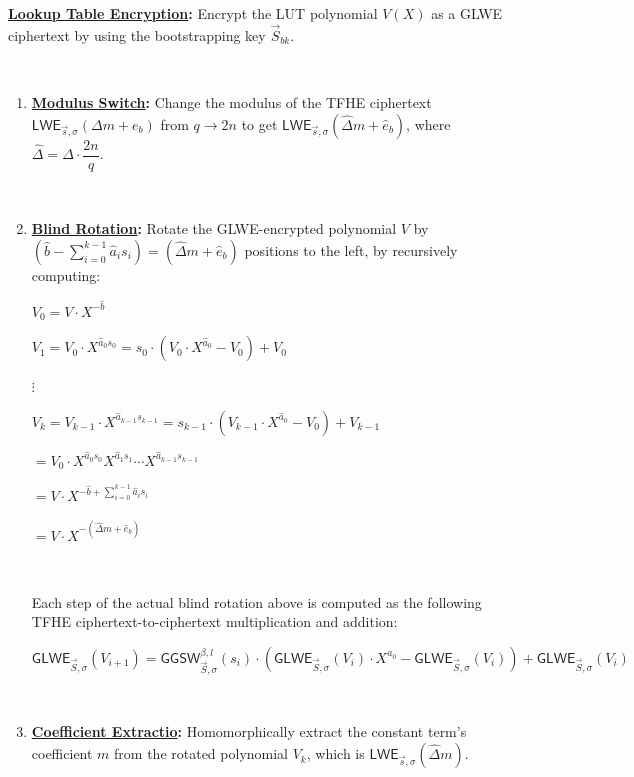 \begin{tcolorbox}[title={\textbf{\tboxlabel{\ref*{subsec:tfhe-summary}} TFHE Noise Bootstrapping Procedure}}]

\textbf{\underline{Lookup Table Encryption}:} Encrypt the LUT polynomial $V(X)$ as a GLWE ciphertext by using the bootstrapping key $\vec{S}_{bk}$.

$ $
  
\begin{enumerate}
\item \textbf{\underline{Modulus Switch}:} Change the modulus of the TFHE ciphertext $\textsf{LWE}_{\vec{s}, \sigma}(\Delta m + e_b)$ from $q \rightarrow 2n$ to get $\textsf{LWE}_{\vec{s}, \sigma}(\hat{\Delta} m + \hat e_b)$, where $\hat\Delta = \Delta \cdot \dfrac{2n}{q}$.

$ $

\item \textbf{\underline{Blind Rotation}:} Rotate the GLWE-encrypted polynomial $V$ by $(\hat{b} - \sum\limits_{i=0}^{k-1}{\hat{a}_is_i}) = (\hat{\Delta}m + \hat{e}_b)$ positions to the left, by recursively computing: 

$V_0 = V \cdot X^{-\hat{b}}$

$V_1 = V_0 \cdot X^{\hat{a}_0s_0} = s_0 \cdot (V_0 \cdot X^{\hat{a}_0} - V_0) + V_0$

\text{ } $\vdots$

$V_k = V_{k-1} \cdot X^{\hat{a}_{k-1}s_{k-1}} = s_{k-1} \cdot (V_{k-1} \cdot X^{\hat{a}_0} - V_0) + V_{k-1}$

$= V_0 \cdot X^{\hat{a}_0s_0}X^{\hat{a}_1s_1}\cdots X^{\hat{a}_{k-1}s_{k-1}}$

$= V \cdot X^{- \hat{b} + \sum_{i=0}^{k-1}{\hat{a}_is_i}} $

$ = V \cdot X^{-(\hat{\Delta}m + \hat{e}_b)}$

$ $

\noindent Each step of the actual blind rotation above is computed as the following TFHE ciphertext-to-ciphertext multiplication and addition:

$\textsf{GLWE}_{\vec{S}, \sigma}(V_{i+1}) = \textsf{GGSW}_{\vec{S}, \sigma}^{\beta, l}(s_i) \cdot (\textsf{GLWE}_{\vec{S}, \sigma}(V_i) \cdot X^{a_0} - \textsf{GLWE}_{\vec{S}, \sigma}(V_i)) + \textsf{GLWE}_{\vec{S}, \sigma}(V_i)$

$ $

\item \textbf{\underline{Coefficient Extractio}:} Homomorphically extract the constant term's coefficient $m$ from the rotated polynomial $V_k$, which is $\textsf{LWE}_{\vec{s}, \sigma}(\hat{\Delta}m)$. 


\end{enumerate}
\end{tcolorbox}

